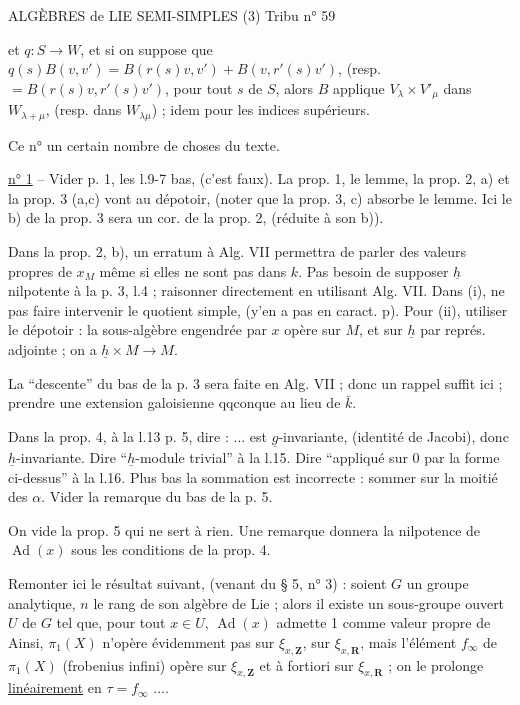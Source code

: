 

ALGÈBRES de LIE SEMI-SIMPLES (3) \hfill Tribu n° 59

et $q:S\longrightarrow W$, et si on suppose que $q(s)B(v,v')=B(r(s)v,v')+B(v,r'(s)v')$, (resp. $=B(r(s)v,r'(s)v')$, pour tout $s$ de $S$, alors $B$ applique $V_\lambda\times V'_\mu$ dans $W_{\lambda+\mu}$, (resp. dans $W_{\lambda\mu}$) ; idem pour les indices supérieurs.

Ce n°  un certain nombre de choses du texte.

\uline{n° 1} -- Vider p. 1, les l.9-7 bas, (c'est faux). La prop. 1, le lemme, la prop. 2, a) et la prop. 3 (a,c) vont au dépotoir, (noter que la prop. 3, c) absorbe le lemme. Ici le b) de la prop. 3 sera un cor. de la prop. 2, (réduite à son b)).

Dans la prop. 2, b), un erratum à Alg. VII permettra de parler des valeurs propres de $x_M$ même si elles ne sont pas dans $k$. Pas besoin de supposer $\underline{h}$ nilpotente à la p. 3, l.4 ; raisonner directement en utilisant Alg. VII. Dans (i), ne pas faire intervenir le quotient simple, (y'en a pas en caract. p). Pour (ii), utiliser le dépotoir : la sous-algèbre engendrée par $x$ opère sur $M$, et sur $\underline{h}$ par représ. adjointe ; on a $\underline{h}\times M\longrightarrow M$.

La ``descente'' du bas de la p. 3 sera faite en Alg. VII ; donc un rappel suffit ici ; prendre une extension galoisienne qqconque au lieu de $\bar k$.

Dans la prop. 4, à la l.13 p. 5, dire : ... est $\underline{g}$-invariante, (identité de Jacobi), donc $\underline{h}$-invariante. Dire ``$\underline{h}$-module trivial'' à la l.15. Dire ``appliqué sur 0 par la forme ci-dessus'' à la l.16. Plus bas la sommation est incorrecte : sommer sur la moitié des $\alpha$. Vider la remarque du bas de la p. 5.

On vide la prop. 5 qui ne sert à rien. Une remarque donnera la nilpotence de $\operatorname{Ad}(x)$ sous les conditions de la prop. 4.

Remonter ici le résultat suivant, (venant du § 5, n° 3) : soient $G$ un groupe analytique, $n$ le rang de son algèbre de Lie ; alors il existe un sous-groupe ouvert $U$ de $G$ tel que, pour tout $x\in U$, $\operatorname{Ad}(x)$ admette 1 comme valeur propre de
Ainsi, $\pi_1(X)$ n'opère évidemment pas sur $\xi_{x,\mathbf Z}$,  sur $\xi_{x,\mathbf R}$, mais l'élément $f_\infty$ de $\pi_1(X)$ (frobenius infini) opère sur $\xi_{x,\mathbf Z}$ et à fortiori sur $\xi_{x,\mathbf R}$ ; on le prolonge \uline{linéairement} en $\tau=f_\infty$ ....

